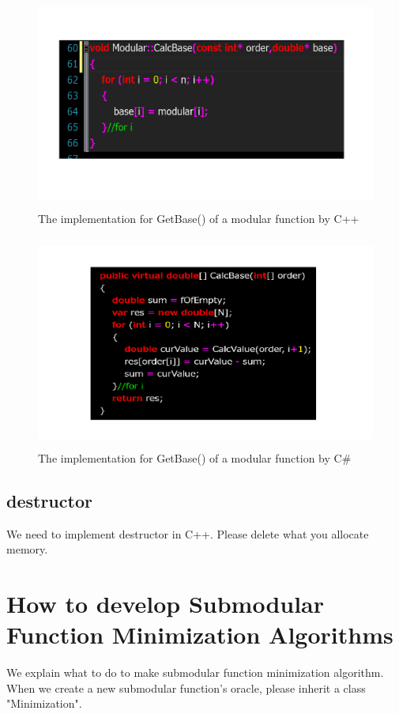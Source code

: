 \documentclass{article}
\begin{document}
\begin{figure}[h!]\label{C++CalcBaseModular}
{
\fontsize{10pt}{12pt}\selectfont
\centering
\includegraphics[height=7.0cm]{picture/C++CalcBaseModular.png}
\caption{The implementation for GetBase() of a modular function by C++}
}
\end{figure}

\begin{figure}[h!]\label{CSCalcBaseModular}
{
\fontsize{10pt}{12pt}\selectfont
\centering
\includegraphics[height=7.0cm]{picture/CSCalcBaseModular.png}
\caption{The implementation for GetBase() of a modular function by C\#}
}
\end{figure}


\subsection{destructor}
We need to implement destructor in C++.
Please delete what you allocate memory.



\newpage
\section{How to develop Submodular Function Minimization Algorithms}
We explain what to do to make submodular function minimization algorithm.
When we create a new submodular function's oracle,
please inherit a class "Minimization".
\end{document}
